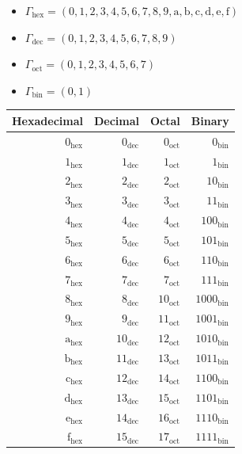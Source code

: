 \documentclass{article}
\begin{document}
\begin{itemize}
\item $\Gamma_{\text{hex}} = (0, 1, 2, 3, 4, 5, 6, 7, 8, 9, \text{a}, \text{b}, \text{c}, \text{d}, \text{e}, \text{f})$
\item $\Gamma_{\text{dec}} = (0, 1, 2, 3, 4, 5, 6, 7, 8, 9)$
\item $\Gamma_{\text{oct}} = (0, 1, 2, 3, 4, 5, 6, 7)$
\item $\Gamma_{\text{bin}} = (0, 1)$
\end{itemize}

\begin{center}
  \begin{tabular}{|r|r|r|r|}
    \hline
    Hexadecimal & Decimal & Octal & Binary \\
    \hline
    $0_{\text{hex}}$ & $0_{\text{dec}}$ & $0_{\text{oct}}$ & $0_{\text{bin}}$ \\
    $1_{\text{hex}}$ & $1_{\text{dec}}$ & $1_{\text{oct}}$ & $1_{\text{bin}}$ \\
    $2_{\text{hex}}$ & $2_{\text{dec}}$ & $2_{\text{oct}}$ & $10_{\text{bin}}$ \\
    $3_{\text{hex}}$ & $3_{\text{dec}}$ & $3_{\text{oct}}$ & $11_{\text{bin}}$ \\
    $4_{\text{hex}}$ & $4_{\text{dec}}$ & $4_{\text{oct}}$ & $100_{\text{bin}}$ \\
    $5_{\text{hex}}$ & $5_{\text{dec}}$ & $5_{\text{oct}}$ & $101_{\text{bin}}$ \\
    $6_{\text{hex}}$ & $6_{\text{dec}}$ & $6_{\text{oct}}$ & $110_{\text{bin}}$ \\
    $7_{\text{hex}}$ & $7_{\text{dec}}$ & $7_{\text{oct}}$ & $111_{\text{bin}}$ \\
    $8_{\text{hex}}$ & $8_{\text{dec}}$ & $10_{\text{oct}}$ & $1000_{\text{bin}}$ \\
    $9_{\text{hex}}$ & $9_{\text{dec}}$ & $11_{\text{oct}}$ & $1001_{\text{bin}}$ \\
    $\text{a}_{\text{hex}}$ & $10_{\text{dec}}$ & $12_{\text{oct}}$ & $1010_{\text{bin}}$ \\
    $\text{b}_{\text{hex}}$ & $11_{\text{dec}}$ & $13_{\text{oct}}$ & $1011_{\text{bin}}$ \\
    $\text{c}_{\text{hex}}$ & $12_{\text{dec}}$ & $14_{\text{oct}}$ & $1100_{\text{bin}}$ \\
    $\text{d}_{\text{hex}}$ & $13_{\text{dec}}$ & $15_{\text{oct}}$ & $1101_{\text{bin}}$ \\
    $\text{e}_{\text{hex}}$ & $14_{\text{dec}}$ & $16_{\text{oct}}$ & $1110_{\text{bin}}$ \\
    $\text{f}_{\text{hex}}$ & $15_{\text{dec}}$ & $17_{\text{oct}}$ & $1111_{\text{bin}}$ \\
    \hline
  \end{tabular}
\end{center}
\end{document}
